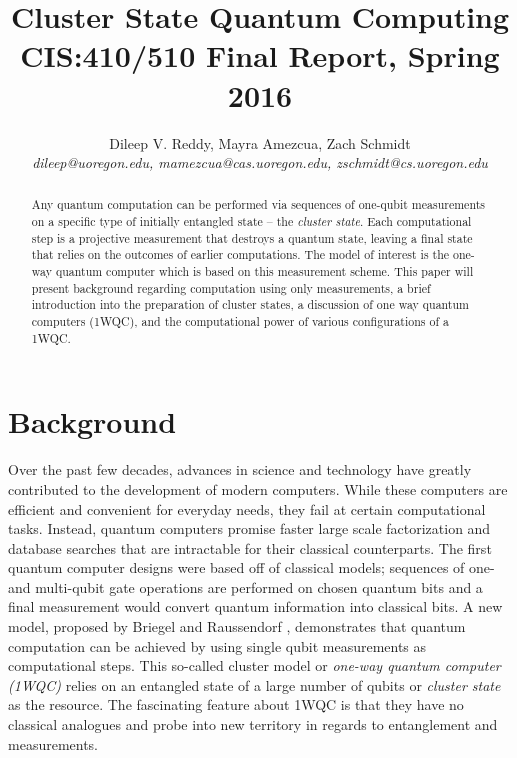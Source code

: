 \documentclass[twocolumn]{Styles/IEEEtran11}
\begin{document}


\title{{\Large \bf Cluster State Quantum Computing}\\ {\normalsize CIS:410/510 Final Report, Spring 2016}}
\author{
Dileep V. Reddy, Mayra Amezcua, Zach Schmidt \\
{\em dileep@uoregon.edu, mamezcua@cas.uoregon.edu, zschmidt@cs.uoregon.edu }
}
\maketitle

\begin{abstract}
Any quantum computation can be performed via sequences of one-qubit measurements on a specific type of initially entangled state -- the \textit{cluster state}. Each computational step is a projective measurement that destroys a quantum state, leaving a final state that relies on the outcomes of earlier computations. The model of interest is the one-way quantum computer which is based on this measurement scheme. This paper will present background regarding computation using only measurements, a brief introduction into the preparation of cluster states, a discussion of one way quantum computers (1WQC), and the computational power of various configurations of a 1WQC.
\end{abstract}


\section{Background}
Over the past few decades, advances in science and technology have greatly contributed to the development of modern computers. While these computers are efficient and convenient for everyday needs, they fail at certain computational tasks. Instead, quantum computers promise faster large scale factorization and database searches that are intractable for their classical counterparts. The first quantum computer designs were based off of classical models; sequences of one- and multi-qubit gate operations are performed on chosen quantum bits and a final measurement would convert quantum information into classical bits. A new model, proposed by Briegel and Raussendorf \cite{briegel2000measurements}, demonstrates that quantum computation can be achieved by using single qubit measurements as computational steps. This so-called cluster model or \textit{one-way quantum computer (1WQC)} relies on an entangled state of a large number of qubits or \textit{cluster state} as the resource. The fascinating feature about 1WQC is that they have no classical analogues and probe into new territory in regards to entanglement and measurements. 
\end{document}

